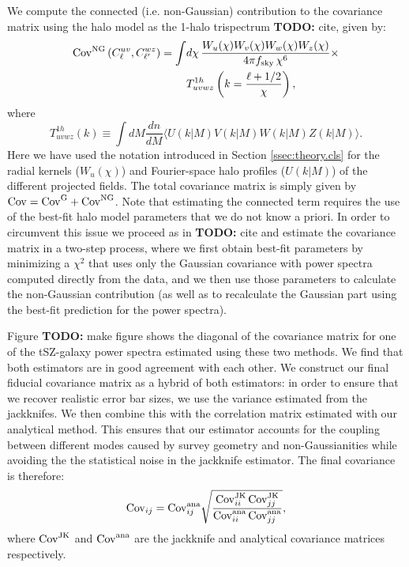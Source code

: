 \documentclass[useAMS,usenatbib]{mn2e}
\newcommand{\TODO}[1]{{\bf TODO:} #1}
\begin{document}
    We compute the connected (i.e. non-Gaussian) contribution to the covariance matrix using the halo model as the 1-halo trispectrum \TODO{cite}, given by:
    \begin{align}\nonumber
      {\rm Cov}^{\rm NG}\left(C^{uv}_\ell,C^{wz}_{\ell'}\right)=\int &d\chi\,\frac{W_u(\chi)W_v(\chi)W_w(\chi)W_z(\chi)}{4\pi f_{\rm sky}\,\chi^6}\times\\\label{eq:cov_ng}
      &T^{1h}_{uvwz}\left(k=\frac{\ell+1/2}{\chi}\right),
    \end{align}
    where
    \begin{equation}\nonumber
      T^{1h}_{uvwz}(k)\equiv\int dM\frac{dn}{dM}\langle U(k|M) V(k|M) W(k|M) Z(k|M)\rangle.
    \end{equation}
    Here we have used the notation introduced in Section \ref{ssec:theory.cls} for the radial kernels ($W_u(\chi)$) and Fourier-space halo profiles ($U(k|M)$) of the different projected fields. The total covariance matrix is simply given by ${\rm Cov}={\rm Cov}^{\rm G}+{\rm Cov}^{\rm NG}$. Note that estimating the connected term requires the use of the best-fit halo model parameters that we do not know a priori. In order to circumvent this issue we proceed as in \TODO{cite} and estimate the covariance matrix in a two-step process, where we first obtain best-fit parameters by minimizing a $\chi^2$ that uses only the Gaussian covariance with power spectra computed directly from the data, and we then use those parameters to calculate the non-Gaussian contribution (as well as to recalculate the Gaussian part using the best-fit prediction for the power spectra).

    Figure  \TODO{make figure} shows the diagonal of the covariance matrix for one of the tSZ-galaxy power spectra estimated using these two methods. We find that both estimators are in good agreement with each other. We construct our final fiducial covariance matrix as a hybrid of both estimators: in order to ensure that we recover realistic error bar sizes, we use the variance estimated from the jackknifes. We then combine this with the correlation matrix estimated with our analytical method. This ensures that our estimator accounts for the coupling between different modes caused by survey geometry and non-Gaussianities while avoiding the the statistical noise in the jackknife estimator. The final covariance is therefore:
    \begin{equation}
      {\rm Cov}_{ij} = {\rm Cov}^{\rm ana}_{ij} \sqrt{\frac{{\rm Cov}^{\rm JK}_{ii}\,{\rm Cov}^{\rm JK}_{jj}}{{\rm Cov}^{\rm ana}_{ii}\,{\rm Cov}^{\rm ana}_{jj}}},
    \end{equation}
    where ${\rm Cov}^{\rm JK}$ and ${\rm Cov}^{\rm ana}$ are the jackknife and analytical covariance matrices respectively.
\end{document}
